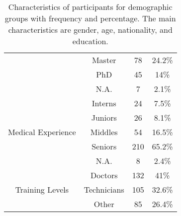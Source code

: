 \begin{table}[htpb]
{\begin{tabular}{cccc}
                                 & Master                   & 78        & 24.2\%     \\
                                 & PhD                      & 45        & 14\%       \\
                                 & N.A.                     & 7         & 2.1\%      \\
\hline
\multirow[t]{5}{*}{Medical Experience} & Interns            & 24        & 7.5\%      \\
                                       & Juniors            & 26        & 8.1\%      \\
                                       & Middles            & 54        & 16.5\%     \\
                                       & Seniors            & 210       & 65.2\%     \\
                                       & N.A.               & 8         & 2.4\%      \\
\hline
\multirow[t]{3}{*}{Training Levels}    & Doctors            & 132       & 41\%       \\
                                       & Technicians        & 105       & 32.6\%     \\
                                       & Other              & 85        & 26.4\%     \\
\hline
\end{tabular}%
}
\caption{Characteristics of participants for demographic groups with frequency and percentage. The main characteristics are gender, age, nationality, and education.}
\label{tab:tab008}
\end{table}